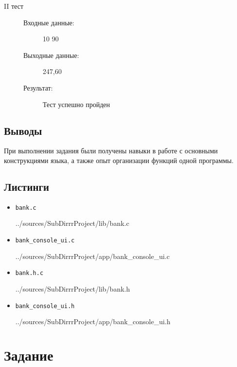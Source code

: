 \documentclass[12pt,a4paper]{report}
\begin{document}
\begin{enumerate}
\begin{description}
\item[II тест]
\hspace{\parindent}
\begin{flushleft}
\begin{description}
\item[Входные данные:] 10 90
\item[Выходные данные:] 247,60
\item[Результат:] Тест успешно пройден
\end{description}
\end{flushleft}
\end{description}

\end{enumerate}

\subsection{Выводы}
\hspace{\parindent}
При выполнении задания были получены навыки в работе с основными конструкциями языка, а также опыт организации функций одной программы.
\subsection*{Листинги}
\begin{itemize}
\item[] \verb-bank.c-

{../sources/SubDirrrProject/lib/bank.c}
\item[] \verb-bank_console_ui.c-

{../sources/SubDirrrProject/app/bank_console_ui.c}
\item[] \verb-bank.h.c-

{../sources/SubDirrrProject/lib/bank.h}
\item[] \verb-bank_console_ui.h-

{../sources/SubDirrrProject/app/bank_console_ui.h}
\end{itemize}

%

\section{Задание}
\end{document}

